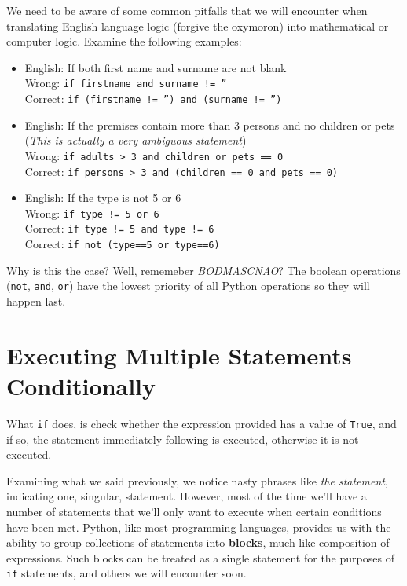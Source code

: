 We need to be aware of some common pitfalls that we will encounter   when translating English language logic (forgive the oxymoron) into   mathematical or computer logic. Examine the following examples:
\begin{itemize}
	\item English: If both first name and surname are not blank
\\     Wrong: \texttt{if firstname and surname != ''}    
\\     Correct: \texttt{if (firstname != '') and (surname != '')}   
	\item English: If the premises contain more than 3 persons and no    children or pets (\textit{This is actually a very ambiguous statement})
\\     Wrong: \texttt{if adults > 3 and children or pets == 0}    
\\     Correct: \texttt{if persons > 3 and (children == 0 and pets == 0)}    
	\item English: If the type is not 5 or 6
\\     Wrong: \texttt{if type != 5 or 6}    
\\     Correct: \texttt{if type != 5 and type != 6}
\\     Correct: \texttt{if not (type==5 or type==6)}     
\end{itemize}

Why is this the case? Well, rememeber \textit{BODMASCNAO}? The boolean operations (\texttt{not}, \texttt{and}, \texttt{or}) have the lowest priority of all Python operations so they                 will happen last.

\section{Executing Multiple Statements Conditionally}     What \texttt{if} does, is check whether the expression provided has a    value of \texttt{True}, and if so, the statement immediately    following is executed, otherwise it is not executed.    

Examining what we said previously, we notice nasty phrases like \textit{the   statement}, indicating one, singular, statement. However, most of the   time we'll have a number of statements that we'll only want to execute when certain   conditions have been met. Python, like most programming languages,   provides us with the ability to group collections of statements into   \textbf{blocks}, much like composition of expressions. Such   blocks can be treated as a single statement for the purposes of \texttt{if}   statements, and others we will encounter soon.

